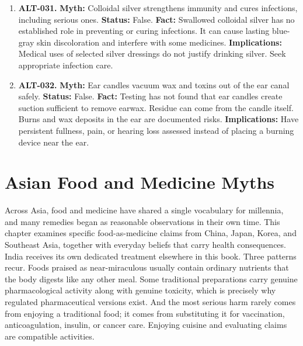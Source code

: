 \documentclass[11pt,oneside]{book}
\begin{document}
\begin{enumerate}[leftmargin=0pt,labelwidth=0pt,labelsep=0pt,itemindent=0pt]
\textbf{Implications:} Seek exposure-specific assessment if there is a credible concern about lead or another metal.
\item[] \textbf{ALT-031.} \textbf{Myth:} Colloidal silver strengthens immunity and cures infections, including serious ones.\newline
\textbf{Status:} False.\newline
\textbf{Fact:} Swallowed colloidal silver has no established role in preventing or curing infections. It can cause lasting blue-gray skin discoloration and interfere with some medicines. \cite{ref132}\newline
\textbf{Implications:} Medical uses of selected silver dressings do not justify drinking silver. Seek appropriate infection care.
\item[] \textbf{ALT-032.} \textbf{Myth:} Ear candles vacuum wax and toxins out of the ear canal safely.\newline
\textbf{Status:} False.\newline
\textbf{Fact:} Testing has not found that ear candles create suction sufficient to remove earwax. Residue can come from the candle itself. Burns and wax deposits in the ear are documented risks. \cite{ref133}\newline
\textbf{Implications:} Have persistent fullness, pain, or hearing loss assessed instead of placing a burning device near the ear.
\end{enumerate}

\chapter{Asian Food and Medicine Myths}
Across Asia, food and medicine have shared a single vocabulary for millennia, and many remedies began as reasonable observations in their own time. This chapter examines specific food-as-medicine claims from China, Japan, Korea, and Southeast Asia, together with everyday beliefs that carry health consequences. India receives its own dedicated treatment elsewhere in this book. Three patterns recur. Foods praised as near-miraculous usually contain ordinary nutrients that the body digests like any other meal. Some traditional preparations carry genuine pharmacological activity along with genuine toxicity, which is precisely why regulated pharmaceutical versions exist. And the most serious harm rarely comes from enjoying a traditional food; it comes from substituting it for vaccination, anticoagulation, insulin, or cancer care. Enjoying cuisine and evaluating claims are compatible activities.
\end{document}
